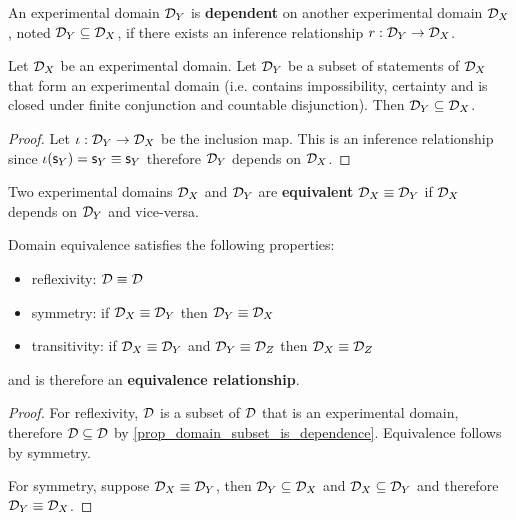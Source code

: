 \documentclass[11pt,letterpaper,fleqn]{memoir} %
\begin{document}
\begin{mathSection}
	\begin{defn}
		An experimental domain $\mathcal{D}_Y$ is \textbf{dependent} on another experimental domain $\mathcal{D}_X$, noted $\mathcal{D}_Y \subseteq \mathcal{D}_X$, if there exists an inference relationship $r: \mathcal{D}_Y \to \mathcal{D}_X$.
	\end{defn}
	\begin{coro}\label{prop_domain_subset_is_dependence}
		Let $\mathcal{D}_X$ be an experimental domain. Let $\mathcal{D}_Y$ be a subset of statements of $\mathcal{D}_X$ that form an experimental domain (i.e. contains impossibility, certainty and is closed under finite conjunction and countable disjunction). Then $\mathcal{D}_Y \subseteq \mathcal{D}_X$.
	\end{coro}
	\begin{proof}
		Let $\iota : \mathcal{D}_Y \to \mathcal{D}_X$ be the inclusion map. This is an inference relationship since $\iota(\mathsf{s}_Y) = \mathsf{s}_Y \equiv \mathsf{s}_Y$ therefore $\mathcal{D}_Y$ depends on $\mathcal{D}_X$.
	\end{proof}
	\begin{defn}
		Two experimental domains $\mathcal{D}_X$ and $\mathcal{D}_Y$ are \textbf{equivalent} $\mathcal{D}_X \equiv \mathcal{D}_Y$ if $\mathcal{D}_X$ depends on $\mathcal{D}_Y$ and vice-versa.
	\end{defn}
	\begin{coro}
		Domain equivalence satisfies the following properties:
		\begin{itemize}
			\item reflexivity: $\mathcal{D} \equiv \mathcal{D}$
			\item symmetry: if $\mathcal{D}_X \equiv \mathcal{D}_Y$ then $\mathcal{D}_Y \equiv \mathcal{D}_X$
			\item transitivity: if $\mathcal{D}_X \equiv \mathcal{D}_Y$ and $\mathcal{D}_Y \equiv \mathcal{D}_Z$ then $\mathcal{D}_X \equiv \mathcal{D}_Z$
		\end{itemize}
		and is therefore an \textbf{equivalence relationship}.
	\end{coro}
	\begin{proof}
		For reflexivity, $\mathcal{D}$ is a subset of $\mathcal{D}$ that is an experimental domain, therefore $\mathcal{D} \subseteq \mathcal{D}$ by \ref{prop_domain_subset_is_dependence}. Equivalence follows by symmetry.
		
		For symmetry, suppose $\mathcal{D}_X \equiv \mathcal{D}_Y$, then $\mathcal{D}_Y \subseteq \mathcal{D}_X$ and $\mathcal{D}_X \subseteq \mathcal{D}_Y$ and therefore $\mathcal{D}_Y \equiv \mathcal{D}_X$.
		

\end{proof}
\end{mathSection}
\end{document}
